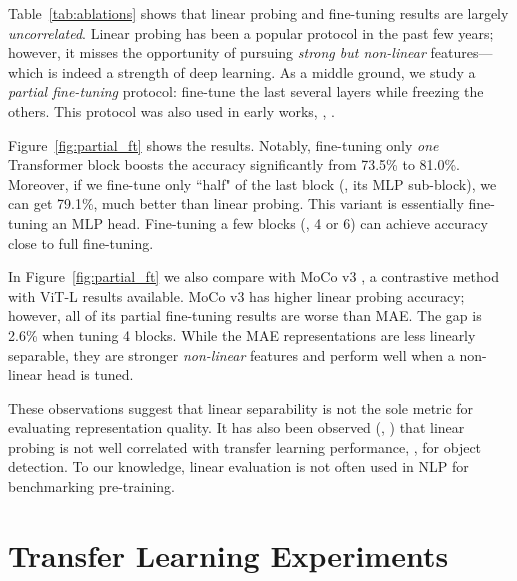 \documentclass[10pt,twocolumn,letterpaper]{article}
\begin{document}
Table~\ref{tab:ablations} shows that linear probing and fine-tuning results are largely \textit{uncorrelated}. Linear probing has been a popular protocol in the past few years; however, it misses the opportunity of pursuing \textit{strong but non-linear} features---which is indeed a strength of deep learning. As a middle ground, we study a \textit{partial fine-tuning} protocol: fine-tune the last several layers while freezing the others. This protocol was also used in early works, \eg, \cite{Yosinski2014,Zhang2016,Noroozi2016}.

Figure~\ref{fig:partial_ft} shows the results. Notably, fine-tuning only \textit{one} Transformer block boosts the accuracy significantly from 73.5\% to 81.0\%. Moreover, if we fine-tune only ``half" of the last block (\ie, its MLP sub-block), we can get 79.1\%, much better than linear probing. This variant is essentially fine-tuning an MLP head. Fine-tuning a few blocks (\eg, 4 or 6) can achieve accuracy close to full fine-tuning.

In Figure~\ref{fig:partial_ft} we also compare with MoCo v3 \cite{Chen2021a}, a contrastive method with ViT-L results available. MoCo v3 has higher linear probing accuracy; however, all of its partial fine-tuning results are worse than MAE. The gap is 2.6\% when tuning 4 blocks. While the MAE representations are less linearly separable, they are stronger \textit{non-linear} features and perform well when a non-linear head is tuned.

These observations suggest that linear separability is not the sole metric for evaluating representation quality. It has also been observed (\eg, \cite{Chen2021}) that linear probing is not well \mbox{correlated} with transfer learning performance, \eg, for object detection. To our knowledge, linear evaluation is not often used in NLP for benchmarking pre-training.

\section{Transfer Learning Experiments}\label{sec:transfer}
\end{document}
